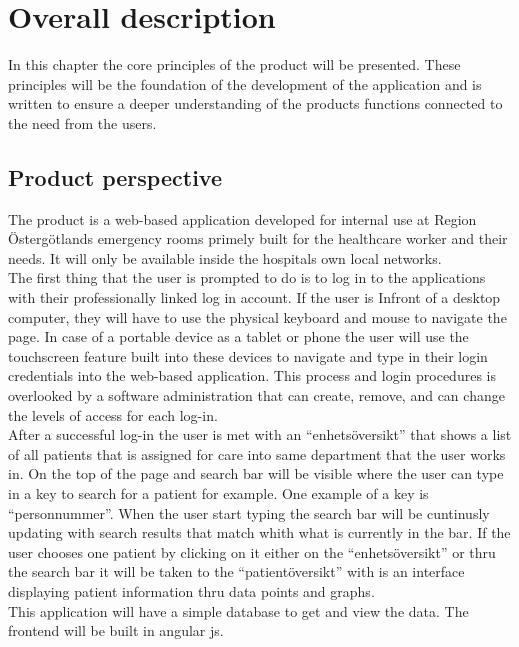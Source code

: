 \section{Overall description}
In this chapter the core principles of the product will be presented. These principles will be the foundation of the development of the application and is written to ensure a deeper understanding of the products functions connected to the need from the users.
\newline

\label{sec:overalldescription}

\subsection{Product perspective}
\label{sec:dataset:subsection}
The product is a web-based application developed for internal use at Region Östergötlands emergency rooms primely built for the healthcare worker and their needs. It will only be available inside the hospitals own local networks. 
\\
The first thing that the user is prompted to do is to log in to the applications with their professionally linked log in account. If the user is Infront of a desktop computer, they will have to use the physical keyboard and mouse to navigate the page. In case of a portable device as a tablet or phone the user will use the touchscreen feature built into these devices to navigate and type in their login credentials into the web-based application. This process and login procedures is overlooked by a software administration that can create, remove, and can change the levels of access for each log-in.  
\\
After a successful log-in the user is met with an “enhetsöversikt” that shows a list of all patients that is assigned for care into same department that the user works in. On the top of the page and search bar will be visible where the user can type in a key to search for a patient for example. One example of a key is “personnummer”. When the user start typing the search bar will be cuntinusly updating with search results that match whith what is currently in the bar. If the user chooses one patient by clicking on it either on the “enhetsöversikt” or thru the search bar it will be taken to the “patientöversikt” with is an interface displaying patient information thru data points and graphs.  
\\
This application will have a simple database to get and view the data. The frontend will be built in angular js. 


